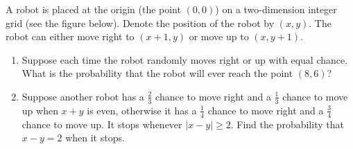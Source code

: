 
\begin{exercise}

A robot is placed at the origin (the point $(0, 0)$) on a two-dimension integer grid (see the figure below).
Denote the position of the robot by $(x, y)$.
The robot can either move right to $(x + 1, y)$ or move up to $(x, y + 1)$.

\begin{center}
\end{center}

\begin{enumerate}[label = (\alph*)]

    \item Suppose each time the robot randomly moves right or up with equal chance.
    What is the probability that the robot will ever reach the point $(8, 6)$?

    \item Suppose another robot has a $\frac{2}{3}$ chance to move right and a $\frac{1}{3}$ chance to move up when $x + y$ is even, otherwise it has a $\frac{1}{4}$ chance to move right and a $\frac{3}{4}$ chance to move up.
    It stops whenever $|x - y| \geq 2$.
    Find the probability that $x - y = 2$ when it stops.

\end{enumerate}

\end{exercise}


